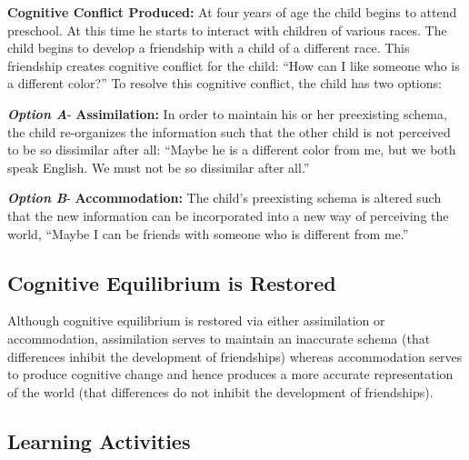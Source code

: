 \documentclass[
]{book}
\begin{document}
\textbf{Cognitive Conflict Produced:} At four years of age the child begins to attend preschool. At this time he starts to interact with children of various races. The child begins to develop a friendship with a child of a different race. This friendship creates cognitive conflict for the child: ``How can I like someone who is a different color?'' To resolve this cognitive conflict, the child has two options:

\textbf{\emph{Option A}}- \textbf{Assimilation:} In order to maintain his or her preexisting schema, the child re-organizes the information such that the other child is not perceived to be so dissimilar after all: ``Maybe he is a different color from me, but we both speak English. We must not be so dissimilar after all.''

\textbf{\emph{Option B}}- \textbf{Accommodation:} The child's preexisting schema is altered such that the new information can be incorporated into a new way of perceiving the world, ``Maybe I can be friends with someone who is different from me.''

\hypertarget{cognitive-equilibrium-is-restored}{%
\subsection*{Cognitive Equilibrium is Restored}\label{cognitive-equilibrium-is-restored}}

Although cognitive equilibrium is restored via either assimilation or accommodation, assimilation serves to maintain an inaccurate schema (that differences inhibit the development of friendships) whereas accommodation serves to produce cognitive change and hence produces a more accurate representation of the world (that differences do not inhibit the development of friendships).

\hypertarget{learning-activities-1}{%
\subsection*{Learning Activities}\label{learning-activities-1}}
\end{document}
